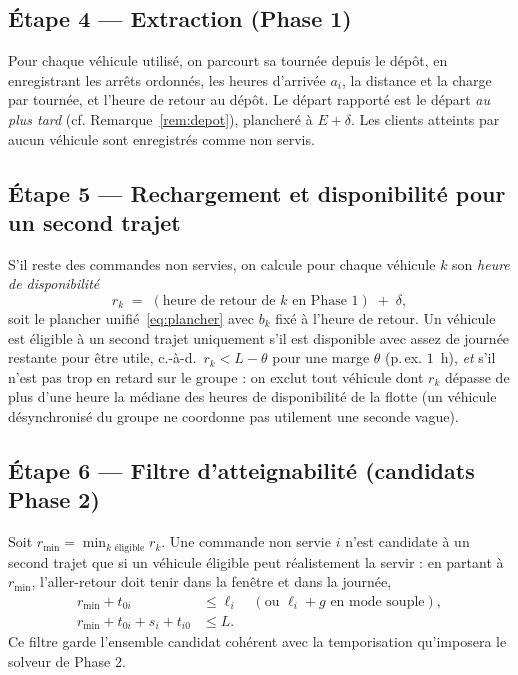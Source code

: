 \documentclass[12pt,a4paper]{report}
\begin{document}
\subsection*{Étape 4 --- Extraction (Phase 1)}
Pour chaque véhicule utilisé, on parcourt sa tournée depuis le dépôt, en
enregistrant les arrêts ordonnés, les heures d'arrivée $a_i$, la distance et
la charge par tournée, et l'heure de retour au dépôt. Le départ rapporté est
le départ \emph{au plus tard} (cf. Remarque~\ref{rem:depot}), plancher\-é à
$E + \delta$. Les clients atteints par aucun véhicule sont enregistrés comme
non servis.

\subsection*{Étape 5 --- Rechargement et disponibilité pour un second trajet}
S'il reste des commandes non servies, on calcule pour chaque véhicule $k$ son
\emph{heure de disponibilité}
%
\begin{equation}
  r_k \;=\; (\text{heure de retour de } k \text{ en Phase 1}) \;+\; \delta,
  \label{eq:dispo}
\end{equation}
%
soit le plancher unifié~\eqref{eq:plancher} avec $b_k$ fixé à l'heure de
retour. Un véhicule est éligible à un second trajet uniquement s'il est
disponible avec assez de journée restante pour être utile, c.-à-d.\ $r_k < L
- \theta$ pour une marge $\theta$ (p.\,ex. $1$~h), \emph{et} s'il n'est pas
trop en retard sur le groupe : on exclut tout véhicule dont $r_k$ dépasse de
plus d'une heure la médiane des heures de disponibilité de la flotte (un
véhicule désynchronisé du groupe ne coordonne pas utilement une seconde
vague).

\subsection*{Étape 6 --- Filtre d'atteignabilité (candidats Phase 2)}
Soit $r_{\min} = \min_{k \text{ éligible}} r_k$. Une commande non servie $i$
n'est candidate à un second trajet que si un véhicule éligible peut
réalistement la servir : en partant à $r_{\min}$, l'aller-retour doit tenir
dans la fenêtre et dans la journée,
%
\begin{align}
  r_{\min} + t_{0i} &\leq \ell_i \quad (\text{ou } \ell_i + g \text{ en mode souple}),
  \label{eq:atteinte1}\\
  r_{\min} + t_{0i} + s_i + t_{i0} &\leq L .
  \label{eq:atteinte2}
\end{align}
%
Ce filtre garde l'ensemble candidat cohérent avec la temporisation
qu'imposera le solveur de Phase 2.
\end{document}
